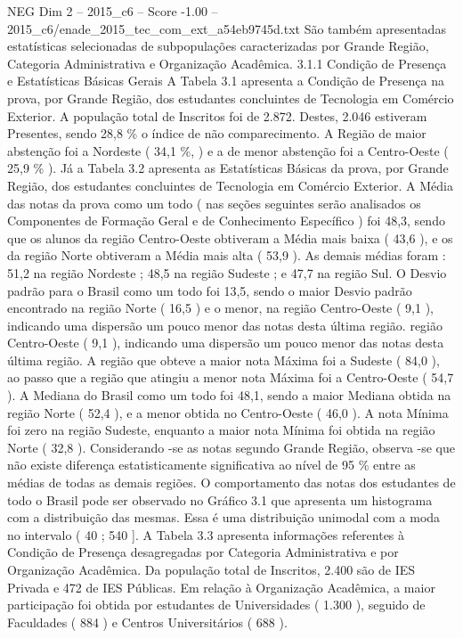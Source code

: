 \begin{textsample}{NEG Dim 2 – 2015\_c6 – Score -1.00 – 2015\_c6/enade\_2015\_tec\_com\_ext\_a54eb9745d.txt}
São também apresentadas estatísticas selecionadas de subpopulações caracterizadas por Grande Região, Categoria Administrativa e Organização Acadêmica. 3.1.1 Condição de Presença e Estatísticas Básicas Gerais A Tabela 3.1 apresenta a Condição de Presença na prova, por Grande Região, dos estudantes concluintes de Tecnologia em Comércio Exterior.
A população total de Inscritos foi de 2.872.
Destes, 2.046 estiveram Presentes, sendo 28,8 \% o índice de não comparecimento.
A Região de maior abstenção foi a Nordeste ( 34,1 \%, ) e a de menor abstenção foi a Centro-Oeste ( 25,9 \% ).
Já a Tabela 3.2 apresenta as Estatísticas Básicas da prova, por Grande Região, dos estudantes concluintes de Tecnologia em Comércio Exterior.
A Média das notas da prova como um todo ( nas seções seguintes serão analisados os Componentes de Formação Geral e de Conhecimento Específico ) foi 48,3, sendo que os alunos da região Centro-Oeste obtiveram a Média mais baixa ( 43,6 ), e os da região Norte obtiveram a Média mais alta ( 53,9 ).
As demais médias foram : 51,2 na região Nordeste ; 48,5 na região Sudeste ; e 47,7 na região Sul.
O Desvio padrão para o Brasil como um todo foi 13,5, sendo o maior Desvio padrão encontrado na região Norte ( 16,5 ) e o menor, na região Centro-Oeste ( 9,1 ), indicando uma dispersão um pouco menor das notas desta última região. região Centro-Oeste ( 9,1 ), indicando uma dispersão um pouco menor das notas desta última região.
A região que obteve a maior nota Máxima foi a Sudeste ( 84,0 ), ao passo que a região que atingiu a menor nota Máxima foi a Centro-Oeste ( 54,7 ).
A Mediana do Brasil como um todo foi 48,1, sendo a maior Mediana obtida na região Norte ( 52,4 ), e a menor obtida no Centro-Oeste ( 46,0 ).
A nota Mínima foi zero na região Sudeste, enquanto a maior nota Mínima foi obtida na região Norte ( 32,8 ).
Considerando -se as notas segundo Grande Região, observa -se que não existe diferença estatisticamente significativa ao nível de 95 \% entre as médias de todas as demais regiões.
O comportamento das notas dos estudantes de todo o Brasil pode ser observado no Gráfico 3.1 que apresenta um histograma com a distribuição das mesmas.
Essa é uma distribuição unimodal com a moda no intervalo ( 40 ; 540 ].
A Tabela 3.3 apresenta informações referentes à Condição de Presença desagregadas por Categoria Administrativa e por Organização Acadêmica.
Da população total de Inscritos, 2.400 são de IES Privada e 472 de IES Públicas.
Em relação à Organização Acadêmica, a maior participação foi obtida por estudantes de Universidades ( 1.300 ), seguido de Faculdades ( 884 ) e Centros Universitários ( 688 ).

\end{textsample}

